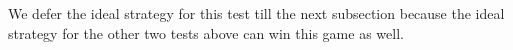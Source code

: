 \documentclass[11pt,letterpaper]{article}
\newcommand{\1}{\mathbb{1}}
\newcommand{\nr}{n(r)}
\newcommand{\fC}{\mathfrak{C}}
\def\carl#1{{\color{blue} #1}}
\theoremstyle{definition}
\begin{document}
We defer the ideal strategy for this test till the next subsection because the ideal
strategy for the other two tests above can win this game as well.



\end{document}
